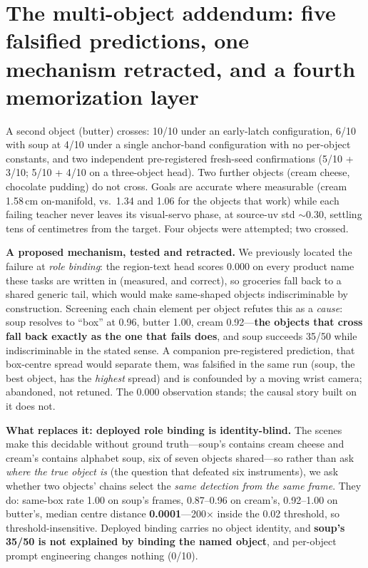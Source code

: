 \documentclass[10pt,letterpaper]{article}
\begin{document}
\section{The multi-object addendum: five falsified predictions, one mechanism
retracted, and a fourth memorization layer}

A second object (butter) crosses: 10/10 under an early-latch configuration,
6/10 with soup at 4/10 under a single anchor-band configuration with no
per-object constants, and two independent pre-registered fresh-seed
confirmations (5/10 + 3/10; 5/10 + 4/10 on a three-object head). Two
further objects (cream cheese, chocolate pudding) do not cross. Goals are
accurate where measurable (cream 1.58\,cm on-manifold, vs.\ 1.34 and 1.06 for
the objects that work) while each failing teacher never leaves its visual-servo
phase, at source-uv std ${\sim}0.30$, settling tens of centimetres from the
target. Four objects were attempted; two crossed.

\noindent \textbf{A proposed mechanism, tested and retracted.} We previously
located the failure at \emph{role binding}: the region-text head scores 0.000
on every product name these tasks are written in (measured, and correct), so
groceries fall back to a shared generic tail, which would make same-shaped
objects indiscriminable by construction. Screening each chain element per
object refutes this as a \emph{cause}: soup resolves to ``box'' at 0.96, butter
1.00, cream 0.92---\textbf{the objects that cross fall back exactly as the one
that fails does}, and soup succeeds 35/50 while indiscriminable in the stated
sense. A companion pre-registered prediction, that box-centre spread would
separate them, was falsified in the same run (soup, the best object, has the
\emph{highest} spread) and is confounded by a moving wrist camera; abandoned,
not retuned. The 0.000 observation stands; the causal story built on it does not.

\noindent \textbf{What replaces it: deployed role binding is identity-blind.}
The scenes make this decidable without ground truth---soup's contains cream
cheese and cream's contains alphabet soup, six of seven objects shared---so
rather than ask \emph{where the true object is} (the question that defeated
six instruments), we ask whether two objects' chains select the \emph{same
detection from the same frame}. They do: same-box rate 1.00 on soup's frames,
0.87--0.96 on cream's, 0.92--1.00 on butter's, median centre distance
\textbf{0.0001}---200$\times$ inside the 0.02 threshold, so
threshold-insensitive. Deployed binding carries no object identity, and
\textbf{soup's 35/50 is not explained by binding the named object}, and
per-object prompt engineering changes nothing (0/10).
\end{document}
